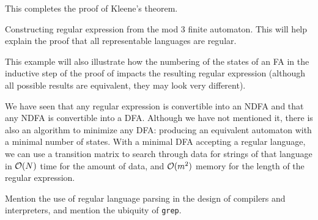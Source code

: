 \documentclass{bcthesis}
\renewcommand{\meo}[1]{}
\begin{document}
	This completes the proof of Kleene's theorem.



\label{sec:examples}

	\begin{example}
		Constructing regular expression from the mod 3 finite automaton.
		This will help explain the proof that all representable languages are regular.

		This example will also illustrate how the numbering of the states of an FA in the inductive step of the proof of  impacts the resulting regular expression (although all possible results are equivalent, they may look very different).
	\end{example}

	\meo{
		Figure out if there are any other parts of the proof that deserve an example to help explain them.
		I will probably include pictures for regular language $\iff$ representable in the initial proof.
	}


\label{sec:motivation}
	\begin{remark}
		We have seen that any regular expression is convertible into an NDFA and that any NDFA is convertible into a DFA.
		Although we have not mentioned it, there is also an algorithm to minimize any DFA: producing an equivalent automaton with a minimal number of states. 
		With a minimal DFA accepting a regular language, we can use a transition matrix to search through data for strings of that language in $\mathcal{O}(N)$ time for the amount of data, and $\mathcal{O}(m^2)$ memory for the length of the regular expression.
	\end{remark}

	\begin{remark}
		Mention the use of regular language parsing in the design of compilers and interpreters, and mention the ubiquity of \texttt{grep}.
	\end{remark}



\iffalse
\mychapter{Mathematical Notation}%
\label{ch:mathematical-notation}

You may find it useful to the reader to provide a table of notation. 

\mychapter{Conclusion(s)}
\label{ch:conclusion}
\fi
\end{document}
